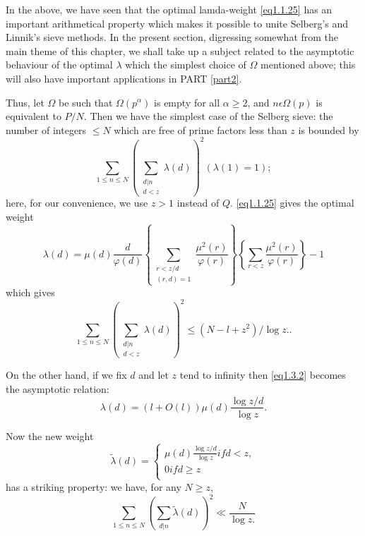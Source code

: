 In the above, we have seen that the optimal lamda-weight
\eqref{eq1.1.25} has an important arithmetical property which
makes it possible to 
unite Selberg's and Linnik's sieve methods. In the present section,
digressing somewhat from the main theme of this chapter, we shall take
up a subject related to the asymptotic behaviour of the optimal
$\lambda$ which the simplest choice of $\Omega$ mentioned above; this
will also have important applications in PART \ref{part2}. 

Thus, let $\Omega$ be such that $\Omega(p^\alpha)$ is empty for all
$\alpha\geq 2$, and $n \epsilon  \Omega(p)$ is equivalent to
$P/N$. Then we have the simplest case of the Selberg sieve: the number
of integers $\leq N$ which are free of prime factors less than $z$ is
bounded by 
\begin{equation*}
  \sum_{1\leq n \leq N}\left(\sum_{\substack{d|n\\d<z}} \lambda(d)\right)^2
  (\lambda(1)=1);\tag{1.3.1} \label{eq1.3.1}
\end{equation*}\pageoriginale
here, for our convenience, we use $z>1$ instead of
$Q$. \eqref{eq1.1.25} gives the optimal weight 
\begin{equation*}
  \lambda(d)=\mu(d)\frac{d}{\varphi(d)}\left\{\sum_{\substack
    {r<z/d\\ (r,d)=1}}
  \frac{\mu^2(r)}{\varphi(r)}\right\}
  \left\{\sum_{r<z}\frac{\mu^2(r)}{\varphi(r)}\right\}-1
  \tag{1.3.2}\label{eq1.3.2}
\end{equation*}
which gives
\begin{equation*}
  \sum_{1\leq n \leq
    N}\left(\sum_{\substack{d|n\\d<z}}\lambda(d)\right)^2 \leq (N-l+z^2)/\log
  z. \tag{1.3.3}. \label{eq1.3.3}
\end{equation*}

On the other hand, if we fix $d$ and let $z$ tend to infinity then
\eqref{eq1.3.2} becomes the asymptotic relation: 
$$
\lambda(d)=(l+O(l))\mu(d)\frac{\log z/d}{\log z}.
$$

Now the new weight
$$
\tilde{\lambda}(d)=
\begin{cases}
  \mu(d)\frac{\log z/d}{\log z} if d <z,\\
  0 if d \geq z\\
\end{cases}
$$
has a striking property: we have, for any $N \geq z$,
\begin{equation*}
  \sum_{1\leq n \leq N}\left(\sum_{d|n}\tilde{\lambda}(d)\right)^2\ll \frac{N}{\log
  z.}\tag {1.3.4} \label{eq1.3.4}
\end{equation*}

